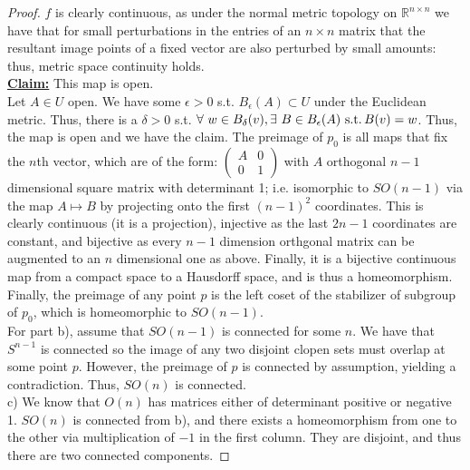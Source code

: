 \documentclass{article}
\newcommand{\st}{\text \ \text{s.t.} \hspace{0.025in} }
\newcommand{\Claim}[1]{\vspace{0.05in} \\ \underline{\textbf{Claim:}} #1 \vspace{0.05in} \\}
\begin{document}
\begin{proof}
  $f$ is clearly continuous, as under the normal metric topology on $\mathbb{R}^{n\times n}$ we have that for small perturbations in the entries of an $n \times n$ matrix that the resultant image points of a fixed vector are also perturbed by small amounts: thus, metric space continuity holds.
  \Claim{This map is open.}
  Let $A\in U$ open. We have some $\epsilon > 0$ s.t. $B_{\epsilon}(A) \subset U$ under the Euclidean metric. Thus, there is a $\delta > 0$ s.t. $\forall \ w \in B_{\delta}(v),  \exists \ B \in B_{\epsilon}(A) \st B(v) = w$. Thus, the map is open and we have the claim. The preimage of $p_{0}$ is all maps that fix the $n$th vector, which are of the form:
 $ \begin{pmatrix}
    A & 0 \\ 0 & 1
  \end{pmatrix} $
  with $A$ orthogonal $n-1$ dimensional square matrix with determinant 1; i.e. isomorphic to $SO(n-1)$ via the map $A \mapsto B$ by projecting onto the first $(n-1)^{2}$ coordinates. This is clearly continuous (it is a projection), injective as the last $2n-1$ coordinates are constant, and bijective as every $n-1$ dimension orthgonal matrix can be augmented to an $n$ dimensional one as above. Finally, it is a bijective continuous map from a compact space to a Hausdorff space, and is thus a homeomorphism. Finally, the preimage of any point $p$ is the left coset of the stabilizer of subgroup of $p_{0}$, which is homeomorphic to $SO(n-1)$. \vspace{0.1in} \\
  For part b), assume that $SO(n-1)$ is connected for some $n$. We have that $S^{n-1}$ is connected so the image of any two disjoint clopen sets must overlap at some point $p$. However, the preimage of $p$ is connected by assumption, yielding a contradiction. Thus, $SO(n)$ is connected. \\

  c) We know that $O(n)$ has matrices either of determinant positive or negative 1. $SO(n)$ is connected from b), and there exists a homeomorphism from one to the other via multiplication of $-1$ in the first column. They are disjoint, and thus there are two connected components. 
\end{proof}
\end{document}

